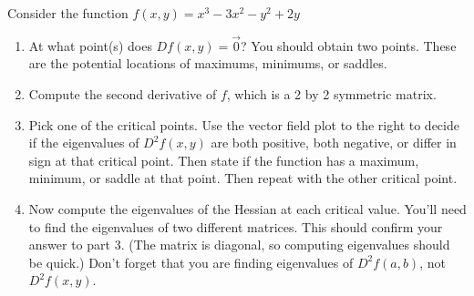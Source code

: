 \mysubsection{\ideanon}
\begin{problem}
%
 Consider the function $f(x,y) = x^3 - 3x ^2 - y^2 + 2y$
\begin{enumerate}
\item 
At what point(s) does $Df(x,y)=\vec 0$? You should obtain two points. These are the potential locations of maximums, minimums, or saddles.   
 \item 
Compute the second derivative of $f$, which is a 2 by 2 symmetric matrix. 
 \item 
Pick one of the critical points. Use the vector field plot to the right to decide if the eigenvalues of $D^2f(x,y)$ are both positive, both negative, or differ in sign at that critical point. Then state if the function has a maximum, minimum, or saddle at that point.  Then repeat with the other critical point. 
 \item 
Now compute the eigenvalues of the Hessian at each critical value. You'll need to find the eigenvalues of two different matrices.  This should confirm your answer to part 3. (The matrix is diagonal, so computing eigenvalues should be quick.)  
Don't forget that you are finding eigenvalues of $D^2f(a,b)$, not $D^2f(x,y)$. 
\end{enumerate}
\end{problem}


